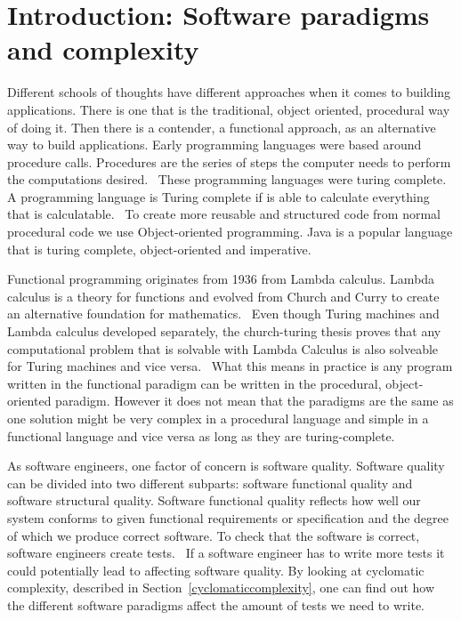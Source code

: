 \chapter{Introduction: Software paradigms and complexity}\label{introduction}

Different schools of thoughts have different approaches when it comes to
building applications. There is one that is the traditional, object oriented,
procedural way of doing it. Then there is a contender, a functional approach, as
an alternative way to build applications.  Early programming languages were
based around procedure calls. Procedures are the series of steps the computer
needs to perform the computations desired.~\cite{proceduralprogramming} These
programming languages were turing complete. A programming language is Turing
complete if is able to calculate everything that is
calculatable.~\cite{turingmachine}  To create more reusable and structured code
from normal procedural code we use Object-oriented programming.  Java is a
popular language that is turing complete, object-oriented and
imperative.~\cite{java} 

Functional programming originates from 1936 from Lambda calculus. Lambda
calculus is a theory for functions and evolved from Church and Curry to create
an alternative foundation for mathematics.~\cite{Turner} Even though Turing
machines and Lambda calculus developed separately, the church-turing thesis
proves that any computational problem that is solvable with Lambda Calculus is
also solveable for Turing machines and vice versa.~\cite{sep-church-turing} What
this means in practice is any program written in the functional paradigm can be
written in the procedural, object-oriented paradigm. However it does not mean
that the paradigms are the same as one solution might be very complex in a
procedural language and simple in a functional language and vice versa as long
as they are turing-complete.

As software engineers, one factor of concern is software quality. Software
quality can be divided into two different subparts: software functional quality
and software structural quality. Software functional quality reflects how well
our system conforms to given functional requirements or specification and the
degree of which we produce correct software.  To check that the software is
correct, software engineers create tests.~\cite{Pressman:2004:SEP:994110} If a
software engineer has to write more tests it could potentially lead to affecting
software quality.  By looking at cyclomatic complexity, described in
Section~\ref{cyclomaticcomplexity}, one can find out how the different software
paradigms affect the amount of tests we need to write.  

